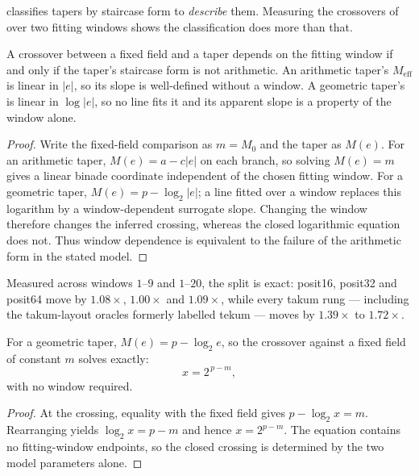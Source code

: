 \label{sec:formprescribes}

 classifies tapers by staircase form to \emph{describe}
them. Measuring the crossovers of  over two fitting
windows shows the classification does more than that.

\begin{theorem}
\label{thm:formwindow}
A crossover between a fixed field and a taper depends on the fitting window if
and only if the taper's staircase form is not arithmetic. An arithmetic taper's
$M_{\mathrm{eff}}$ is linear in $|e|$, so its slope is well-defined without a
window. A geometric taper's is linear in $\log|e|$, so no line fits it and its
apparent slope is a property of the window alone.
\end{theorem}
\begin{proof}
Write the fixed-field comparison as $m=M_0$ and the taper as $M(e)$.
For an arithmetic taper, $M(e)=a-c|e|$ on each branch, so solving
$M(e)=m$ gives a linear binade coordinate independent of the chosen fitting
window.  For a geometric taper, $M(e)=p-\log_2|e|$; a line fitted over
a window replaces this logarithm by a window-dependent surrogate slope.
Changing the window therefore changes the inferred crossing, whereas the
closed logarithmic equation does not.  Thus window dependence is equivalent
to the failure of the arithmetic form in the stated model.
\end{proof}

Measured across windows $1$--$9$ and $1$--$20$, the split is exact: posit16,
posit32 and posit64 move by $1.08\times$, $1.00\times$ and $1.09\times$, while
every takum rung --- including the takum-layout oracles formerly labelled
tekum --- moves by $1.39\times$ to $1.72\times$.

\begin{corollary}
\label{cor:geomcross}
For a geometric taper, $M(e) = p - \log_2 e$, so the crossover against a fixed
field of constant $m$ solves exactly:
\[
  x = 2^{\,p-m},
\]
with no window required.
\end{corollary}
\begin{proof}
At the crossing, equality with the fixed field gives
$p-\log_2 x=m$.  Rearranging yields $\log_2 x=p-m$ and hence
$x=2^{p-m}$.  The equation contains no fitting-window endpoints, so the
closed crossing is determined by the two model parameters alone.
\end{proof}

